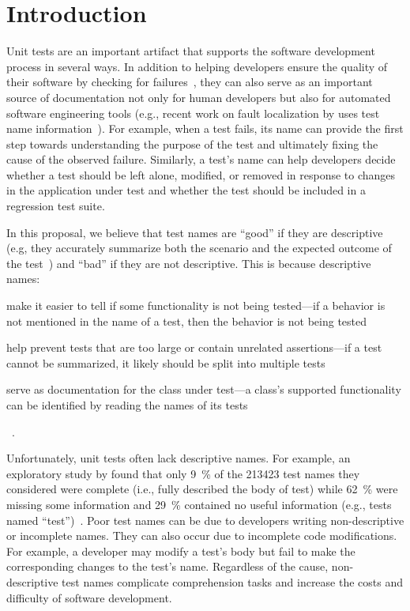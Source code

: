 \section{Introduction}
\label{sec:introduction}

Unit tests are an important artifact that supports the software development process in several ways.
%
In addition to helping developers ensure the quality of their software by checking for failures~\cite{daka2014survey}, they can also serve as an important source of documentation not only for human developers but also for automated software engineering tools (e.g., recent work on fault localization by \citeauthor{li2019deepfl} uses test name information~\cite{li2019deepfl}).
%
For example, when a test fails, its name can provide the first step towards understanding the purpose of the test and ultimately fixing the cause of the observed failure.
%
Similarly, a test's name can help developers decide whether a test should be left alone, modified, or removed in response to changes in the application under test and whether the test should be included in a regression test suite.


In this proposal, we believe that test names are \enquote{good} if they are descriptive (e.g, they accurately summarize both the scenario and the expected outcome of the test~\cite{trenk14}) and \enquote{bad} if they are not descriptive.
%
This is because descriptive names:
\begin{enumerate*}
\item make it easier to tell if some functionality is not being tested---if a behavior is not mentioned in the name of a test, then the behavior is not being tested
\item help prevent tests that are too large or contain unrelated assertions---if a test cannot be summarized, it likely should be split into multiple tests
\item serve as documentation for the class under test---a class's supported functionality can be identified by reading the names of its tests
\end{enumerate*}~\cite{zhang2015automatically}.


Unfortunately, unit tests often lack descriptive names.
%
For example, an exploratory study by \citeauthor{zhang2015automatically} found that only \SI{9}{\percent} of the \num{213423} test names they considered were complete (i.e., fully described the body of test) while \SI{62}{\percent} were missing some information and \SI{29}{\percent} contained no useful information (e.g., tests named \enquote{test})~\cite{zhang2015automatically}.
%
Poor test names can be due to developers writing non-descriptive or incomplete names.
%
They can also occur due to incomplete code modifications.
%
For example, a developer may modify a test's body but fail to make the corresponding changes to the test's name.
%
Regardless of the cause, non-descriptive test names complicate comprehension tasks and increase the costs and difficulty of software development.



